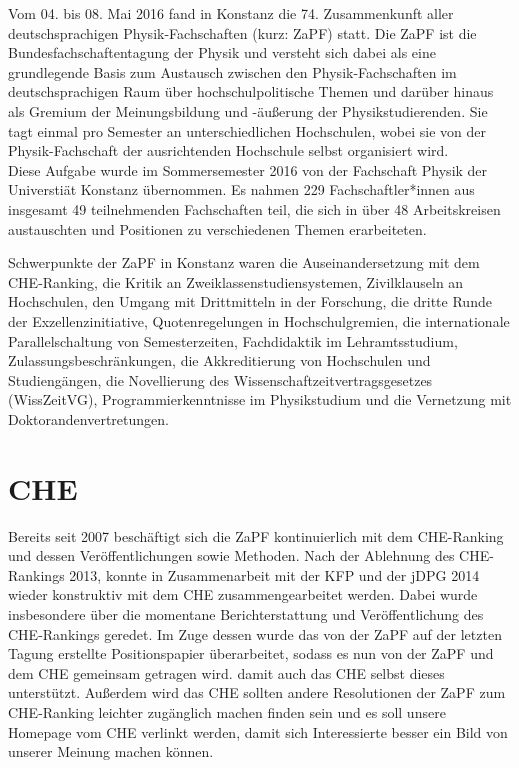 Vom 04. bis 08. Mai 2016 fand in Konstanz die 74. Zusammenkunft
aller deutschsprachigen Physik-Fachschaften (kurz: ZaPF) statt.  Die ZaPF ist
die Bundesfachschaftentagung der Physik und versteht sich dabei als eine
grundlegende Basis zum Austausch zwischen den Physik-Fachschaften im
deutschsprachigen Raum über hochschulpolitische Themen und darüber hinaus als
Gremium der Meinungsbildung und -äußerung der Physikstudierenden. Sie tagt
einmal pro Semester an unterschiedlichen Hochschulen, wobei sie von der
Physik-Fachschaft der ausrichtenden Hochschule selbst organisiert wird. \\

Diese Aufgabe wurde im Sommersemester 2016 von der Fachschaft Physik der Universtiät Konstanz übernommen. Es nahmen 229 Fachschaftler*innen aus
insgesamt 49 teilnehmenden Fachschaften teil, die sich in über  48 Arbeitskreisen austauschten und Positionen zu verschiedenen Themen erarbeiteten.

Schwerpunkte der ZaPF in Konstanz waren die Auseinandersetzung mit dem CHE-Ranking, die Kritik an Zweiklassenstudiensystemen, Zivilklauseln an Hochschulen, den Umgang mit Drittmitteln in der Forschung, die dritte Runde der Exzellenzinitiative, Quotenregelungen in Hochschulgremien, die internationale Parallelschaltung von Semesterzeiten, Fachdidaktik im Lehramtsstudium, Zulassungsbeschränkungen, die Akkreditierung von Hochschulen und Studiengängen, die Novellierung des Wissenschaftzeitvertragsgesetzes (WissZeitVG), Programmierkenntnisse im Physikstudium und die Vernetzung mit Doktorandenvertretungen.

\newpage

\section*{CHE}  
Bereits seit 2007 beschäftigt sich die ZaPF kontinuierlich mit dem CHE-Ranking und dessen
Veröffentlichungen sowie Methoden. Nach der Ablehnung des CHE-Rankings 2013, konnte
in Zusammenarbeit mit der KFP und der jDPG 2014 wieder konstruktiv mit dem CHE
zusammengearbeitet werden. Dabei wurde insbesondere über die momentane Berichterstattung und Veröffentlichung des CHE-Rankings geredet. Im Zuge dessen wurde das von der ZaPF auf der letzten Tagung erstellte Positionspapier überarbeitet, sodass es nun von der ZaPF und dem CHE gemeinsam getragen wird. damit auch das CHE selbst dieses unterstützt. Außerdem wird das CHE sollten andere Resolutionen der ZaPF zum CHE-Ranking leichter zugänglich machen finden sein und es soll unsere Homepage vom CHE verlinkt werden, damit sich Interessierte besser ein Bild von unserer Meinung machen können.

